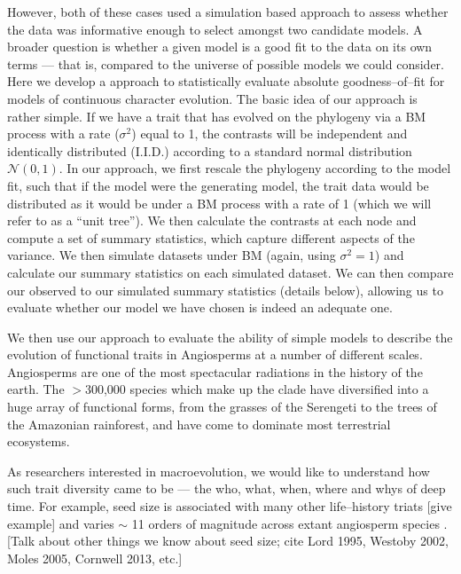 \documentclass[a4paper,12pt]{article}
\begin{document}
However, both of these cases used a simulation based approach to assess whether the data was informative enough to select amongst two candidate models. A broader question is whether a given model is a good fit to the data on its own terms --- that is, compared to the universe of possible models we could consider. Here we develop a approach to statistically evaluate absolute goodness--of--fit for models of continuous character evolution. The basic idea of our approach is rather simple. If we have a trait that has evolved on the phylogeny via a BM process with a rate ($\sigma^2$) equal to 1, the contrasts \citep[\textit{sensu}][see below]{Felsenstein1985} will be independent and identically distributed (I.I.D.) according to a standard normal distribution $\mathcal{N}(0,1)$. In our approach, we first rescale the phylogeny according to the model fit, such that if the model were the generating model, the trait data would be distributed as it would be under a BM process with a rate of 1 (which we will refer to as a ``unit tree''). We then calculate the contrasts at each node and compute a set of summary statistics, which capture different aspects of the variance. We then simulate datasets under BM (again, using $\sigma^2 = 1$) and calculate our summary statistics on each simulated dataset. We can then compare our observed to our simulated summary statistics (details below), allowing us to evaluate whether our model we have chosen is indeed an adequate one.

We then use our approach to evaluate the ability of simple models to describe the evolution of functional traits in Angiosperms at a number of different scales. Angiosperms are one of the most spectacular radiations in the history of the earth. The $>$300,000 species which make up the clade have diversified into a huge array of functional forms, from the grasses of the Serengeti to the trees of the Amazonian rainforest, and have come to dominate most terrestrial ecosystems.

As researchers interested in macroevolution, we would like to understand how such trait diversity came to be --- the who, what, when, where and whys of deep time. For example, seed size is associated with many other life--history triats [give example] and varies $\sim$ 11 orders of magnitude across extant angiosperm species \citep{Westoby1992TREE, Moles2005}. [Talk about other things we know about seed size; cite Lord 1995, Westoby 2002, Moles 2005, Cornwell 2013, etc.]
\end{document}
